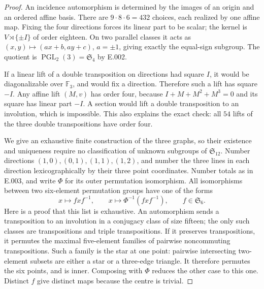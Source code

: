 \begin{proof}
An incidence automorphism is determined by the images of an origin and
an ordered affine basis. There are $9\cdot8\cdot6=432$ choices, each
realized by one affine map. Fixing the four directions forces its linear
part to be scalar; the kernel is $V\rtimes\{\pm I\}$ of order eighteen.
On two parallel classes it acts as $(x,y)\mapsto(ax+b,ay+c)$,
$a=\pm1$, giving exactly the equal-sign subgroup. The quotient is
$\operatorname{PGL}_2(3)=\mathfrak S_4$ by E.002.

If a linear lift of a double transposition on directions had square
$I$, it would be diagonalizable over $\mathbb F_3$, and would fix a
direction. Therefore such a lift has square $-I$. Any affine lift
$(M,v)$ has order four, because $I+M+M^2+M^3=0$ and its square has
linear part $-I$. A section would lift a double transposition to an
involution, which is impossible. This also explains the exact check:
all $54$ lifts of the three double transpositions have order four.

We give an exhaustive finite construction of the three graphs, so their
existence and uniqueness require no classification of unknown subgroups
of $\mathfrak S_{12}$. Number directions
$(1,0),(0,1),(1,1),(1,2)$, and number the three lines in each direction
lexicographically by their three point coordinates. Number totals as in
E.003, and write $\Phi$ for its outer permutation isomorphism. All
isomorphisms between two six-element permutation groups have one of the
forms
\[
 x\longmapsto fxf^{-1},\qquad
 x\longmapsto\Phi^{-1}(fxf^{-1}),\qquad f\in\mathfrak S_6.
\]
Here is a proof that this list is exhaustive. An automorphism sends a
transposition to an involution in a conjugacy class of size fifteen;
the only such classes are transpositions and triple transpositions.
If it preserves transpositions, it permutes the maximal five-element
families of pairwise noncommuting transpositions. Such a family is the
star at one point: pairwise intersecting two-element subsets are either
a star or a three-edge triangle. It therefore permutes the six points,
and is inner. Composing with $\Phi$ reduces the other case to this one.
Distinct $f$ give distinct maps because the centre is trivial.


\end{proof}

